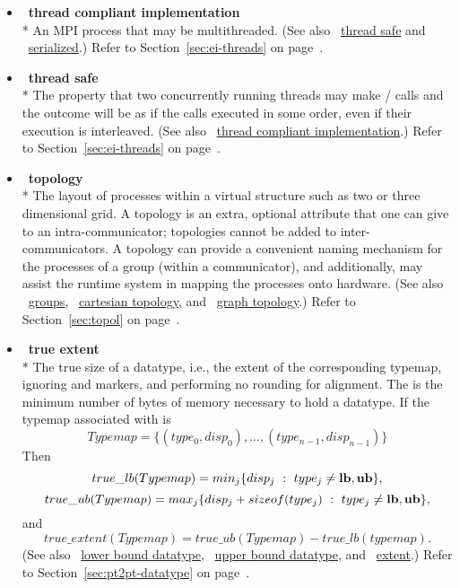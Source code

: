 \begin{itemize}
\label{glossary:thread_compliant_implementation}
\item  ~\hypertarget{glossary:thread_compliant_implementation}{\textbf{thread compliant implementation}} \\*
An MPI process that may be multithreaded.
(See also ~\hyperlink{glossary:thread_safe}{thread safe} and ~\hyperlink{glossary:serialized}{serialized}.)
Refer to Section~\ref{sec:ei-threads} on page~\pageref{sec:ei-threads}.

\label{glossary:thread_safe}
\item  ~\hypertarget{glossary:thread_safe}{\textbf{thread safe}} \\*
The property that two concurrently
running threads may make \MPI/ calls and the outcome will be as if the
calls executed in some order, even if their execution is interleaved.
(See also ~\hyperlink{glossary:thread_compliant_implementation}{thread compliant implementation}.)
Refer to Section~\ref{sec:ei-threads} on page~\pageref{sec:ei-threads}.

\label{glossary:topology}
\item  ~\hypertarget{glossary:topology}{\textbf{topology}} \\*
The layout of processes within a virtual structure such as two or three
dimensional grid.
A topology is an extra,
optional attribute that one can give to an intra-communicator; topologies
cannot be added to inter-communicators.  A topology can provide a convenient
naming mechanism for the processes of a group (within a communicator), and
additionally, may assist the runtime system in mapping the processes onto
hardware.
(See also ~\hyperlink{glossary:groups}{groups},
~\hyperlink{glossary:cartesian_topology}{cartesian topology}, 
and ~\hyperlink{glossary:graph_topology}{graph topology}.)
Refer to Section~\ref{sec:topol} on page~\pageref{sec:topol}.

\label{glossary:true_extent}
\item  ~\hypertarget{glossary:true_extent}{\textbf{true extent}} \\*
The true size of a datatype, i.e., the extent of the corresponding typemap, ignoring
 and  markers, and performing no
rounding for alignment.  The  is the minimum number of bytes of
memory necessary to hold a datatype. 
If the typemap associated with
 is
\[
Typemap = \{ (type_0, disp_0), \ldots , (type_{n-1}, disp_{n-1})\}
\]
Then
\[
true\_lb(Typemap) = min_j  \{ disp_j ~:~ type_j \ne {\bf lb, ub} \},
\]
\[
true\_ub (Typemap) = max_j \{disp_j + sizeof(type_j) ~:~ type_j \ne
{\bf lb, ub}\} ,
\]
and
\[
true\_extent (Typemap) = true\_ub(Typemap) - true\_lb(typemap).
\]
(See also ~\hyperlink{glossary:lower_bound_datatype}{lower bound datatype}, ~\hyperlink{glossary:upper_bound_datatype}{upper bound datatype}, and ~\hyperlink{glossary:extent}{extent}.)
Refer to Section~\ref{sec:pt2pt-datatype} on page~\pageref{sec:pt2pt-datatype}.


\end{itemize}
